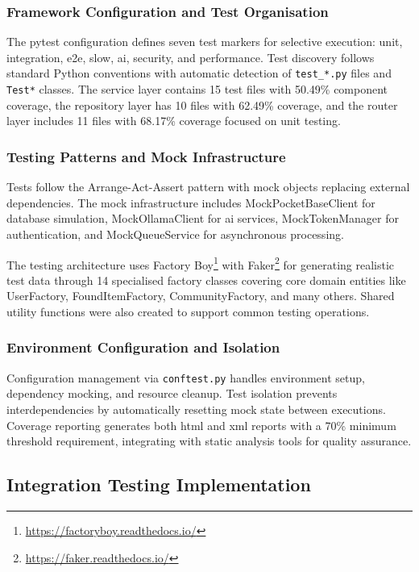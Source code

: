 \subsubsection{Framework Configuration and Test Organisation}

The pytest configuration defines seven test markers for selective execution: unit, integration, e2e, slow, ai, security, and performance. Test discovery follows standard Python conventions with automatic detection of \texttt{test\_*.py} files and \texttt{Test*} classes. The service layer contains 15 test files with 50.49\% component coverage, the repository layer has 10 files with 62.49\% coverage, and the router layer includes 11 files with 68.17\% coverage focused on unit testing.

\subsubsection{Testing Patterns and Mock Infrastructure}

Tests follow the Arrange-Act-Assert pattern \cite{Wake2001,Beck2002} with mock objects replacing external dependencies. The mock infrastructure includes MockPocketBaseClient for database simulation, MockOllamaClient for \ac{ai} services, MockTokenManager for authentication, and MockQueueService for asynchronous processing.

The testing architecture uses Factory Boy\footnote{\url{https://factoryboy.readthedocs.io/}} with Faker\footnote{\url{https://faker.readthedocs.io/}} for generating realistic test data through 14 specialised factory classes covering core domain entities like UserFactory, FoundItemFactory, CommunityFactory, and many others. Shared utility functions were also created to support common testing operations.

\subsubsection{Environment Configuration and Isolation}

Configuration management via \texttt{conftest.py} handles environment setup, dependency mocking, and resource cleanup. Test isolation prevents interdependencies by automatically resetting mock state between executions. Coverage reporting generates both \ac{html} and \ac{xml} reports with a 70\% minimum threshold requirement, integrating with static analysis tools for quality assurance.

\subsection{Integration Testing Implementation} \label{subsection:integration_testing_implementation}

